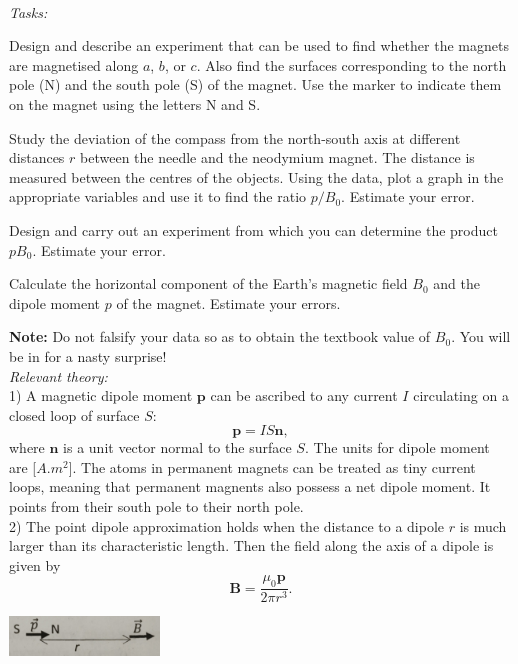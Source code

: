 \documentclass[../TST.tex]{subfiles}
\begin{document}
\begin{eproblem}{\ \\[5pt]}
\textit{Tasks:}
\begin{subpart}
	\item Design and describe an experiment that can be used to find whether the magnets are magnetised along $a$, $b$, or $c$. Also find the surfaces corresponding to the north pole (N) and the south pole (S) of the magnet. Use the marker to indicate them on the magnet using the letters N and S.
	\item Study the deviation of the compass from the north-south axis at different distances $r$ between the needle and the neodymium magnet. The distance is measured between the centres of the objects. Using the data, plot a graph in the appropriate variables and use it to find the ratio $p/B_0$. Estimate your error.
	\item Design and carry out an experiment from which you can determine the product $pB_0$. Estimate your error. 
	\item Calculate the horizontal component of the Earth's magnetic field $B_0$ and the dipole moment $p$ of the magnet. Estimate your errors. 
\end{subpart}
\textbf{Note:} Do not falsify your data so as to obtain the textbook value of $B_0$. You will be in for a nasty surprise!\\

\textit{Relevant theory:}\\
1) A magnetic dipole moment $\mathbf{p}$ can be ascribed to any current $I$ circulating on a closed loop of surface $S$: 
\begin{equation*}
\mathbf{p}=IS \mathbf{n}
,
\end{equation*}
where $\mathbf{n}$ is a unit vector normal to the surface $S$. The units for dipole moment are [$\unit{A.m^2}$]. The atoms in permanent magnets can be treated as tiny current loops, meaning that permanent magnents also possess a net dipole moment. It points from their south pole to their north pole.\\

2) The point dipole approximation holds when the distance to a dipole $r$ is much larger than its characteristic length. Then the field along the axis of a dipole is given by
\begin{equation*}
\mathbf{B}=\frac{\mu_0\mathbf{p}}{2\pi r^3}
.
\end{equation*}
\begin{center}
\includegraphics[width=0.3\textwidth]{fig/2017_e12.png}
\end{center}


\end{eproblem}
\end{document}
